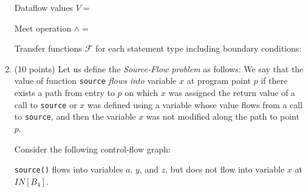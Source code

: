 \documentclass[12pt]{article}
\begin{document}
\begin{enumerate}
\begin{mdframed}
        Dataflow values $V = $  %

        Meet operation $\wedge = $ %

        Transfer functions $\mathcal{F}$ for each statement type including boundary conditions:  %

      \end{mdframed}
      
      \clearpage
      \item (10 points)
      Let us define the \emph{Source-Flow problem} as follows:
      We say that the value of function \lstinline$source$ \emph{flows into} variable $x$ at program point $p$ if
      there exists a path from entry to $p$ on which $x$ was assigned the return value of a call to \lstinline$source$
      or $x$ was defined using a variable whose value flows from a call to \lstinline$source$,
      and then the variable $x$ was not modified along the path to point $p$.

      Consider the following control-flow graph:

      \begin{center}
    \end{center}

      \lstinline$source()$ flows into variables $a$, $y$, and $z$, but does not
      flow into variable $x$ at $IN[B_4]$.


\end{enumerate}
\end{document}
